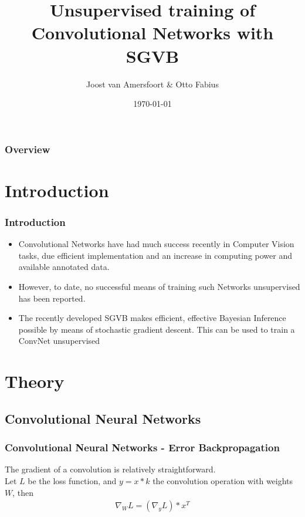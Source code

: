 \documentclass{beamer}
\title[Project Learning Systems]{Unsupervised training of Convolutional Networks with SGVB}
\author{Joost van Amersfoort \& Otto Fabius}
\institute[UvA] 
{University of Amsterdam
Supervisor: Diederik Kingma
\medskip
}
\date{\today} %
\begin{document}
\begin{frame}
\titlepage %
\end{frame}

\begin{frame}
\frametitle{Overview}
\tableofcontents 
\end{frame}


\section{Introduction}


\begin{frame}
\frametitle{Introduction}
\begin{itemize}
	\item Convolutional Networks have had much success recently in Computer Vision tasks, due efficient implementation and an increase in computing power and available annotated data.
	\item However, to date, no successful means of training such Networks unsupervised has been reported.
	\item The recently developed SGVB makes efficient, effective Bayesian Inference possible by means of stochastic gradient descent. This can be used to train a ConvNet unsupervised
\end{itemize}
\end{frame}

\section{Theory}

\subsection{Convolutional Neural Networks}
\begin{frame}
\frametitle{Convolutional Neural Networks - Error Backpropagation}
The gradient of a convolution is relatively straightforward.\\ Let $L$ be the loss function, and $y = x * k$ the convolution operation with weights $W$, then \\   

\begin{align*}
\nabla_W L = (\nabla_y L) * x^T 
\end{align*}

\end{frame}
\end{document}
